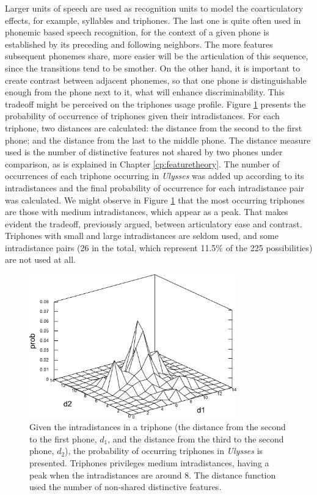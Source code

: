 Larger units of speech are used as recognition units to model the coarticulatory effects,
for example, syllables and triphones. The last one is quite often used in phonemic based
speech recognition, for the context of a given phone is established by its preceding and
following neighbors. 
The more features subsequent phonemes share, more easier will be the articulation of this 
sequence, since the transitions tend to be smother. On the other hand, it is important 
to create contrast between adjacent phonemes, so that one phone is distinguishable
enough from the phone next to it, what will enhance discriminability. This tradeoff
might be perceived on the triphones usage profile. 
Figure \ref{fig:ulysses_triphones_intradistances_mesh} presents the probability of occurrence of
triphones given their intradistances. For each triphone, two distances are calculated: the
distance from the second to the first phone; and the distance from the last to the middle phone.
The distance measure used is the number of distinctive features not shared by two phones under comparison,
as is explained in Chapter \ref{cp:featuretheory}. The number of occurrences of each triphone occurring in 
\textit{Ulysses} was added up 
according to its intradistances and the final probability of occurrence for each intradistance pair 
was calculated. We might observe in Figure \ref{fig:ulysses_triphones_intradistances_mesh}
that the most occurring triphones are those with medium intradistances, which appear as
a peak. That makes evident the tradeoff, previously argued, between articulatory ease and contrast.  
Triphones with small and large intradistances are seldom used, and some intradistance pairs
(26 in the total, which represent 11.5\% of the 225 possibilities) are not used at all.


\begin{figure}[h]
\centering  
\includegraphics[width=0.8\textwidth]{images/ulysses_triphones_intradistances_mesh.pdf}  
\caption{Given the intradistances in a triphone (the distance from the second to the first phone, $d_1$, and the distance from the third to the second phone, $d_2$), the probability of occurring triphones in \textit{Ulysses} is presented. Triphones privileges medium intradistances, having a peak when the intradistances are around 8. The distance function used the number of non-shared distinctive features.}
\label{fig:ulysses_triphones_intradistances_mesh}  
\end{figure} 


